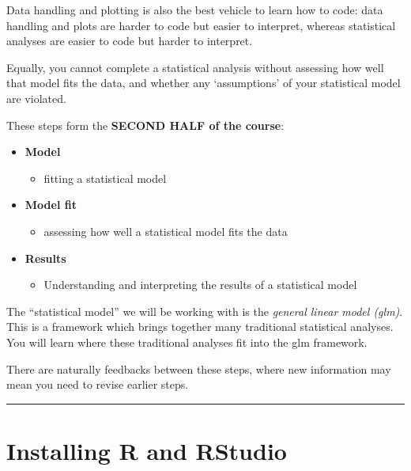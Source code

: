 \documentclass[
]{book}
\providecommand{\tightlist}{%
  \setlength{\itemsep}{0pt}\setlength{\parskip}{0pt}}
\begin{document}
Data handling and plotting is also the best vehicle to learn how to
code: data handling and plots are harder to code but easier to interpret,
whereas statistical analyses are easier to code but harder to interpret.

Equally, you cannot complete a statistical analysis without assessing how well
that model fits the data, and whether any `assumptions' of your statistical
model are violated.

These steps form the \textbf{SECOND HALF of the course}:

\begin{itemize}
\tightlist
\item
  \textbf{Model}

  \begin{itemize}
  \tightlist
  \item
    fitting a statistical model
  \end{itemize}
\item
  \textbf{Model fit}

  \begin{itemize}
  \tightlist
  \item
    assessing how well a statistical model fits the data
  \end{itemize}
\item
  \textbf{Results}

  \begin{itemize}
  \tightlist
  \item
    Understanding and interpreting the results of a statistical model
  \end{itemize}
\end{itemize}

The ``statistical model'' we will be working with is the
\emph{general linear model (glm)}. This is a framework which brings together
many traditional statistical analyses. You will learn where these traditional
analyses fit into the glm framework.

There are naturally feedbacks between these steps, where new information may
mean you need to revise earlier steps.\\
\hspace*{0.333em}

\begin{center}\rule{0.5\linewidth}{0.5pt}\end{center}

\hypertarget{installing-r-and-rstudio}{%
\section{Installing R and RStudio}\label{installing-r-and-rstudio}}
\end{document}
